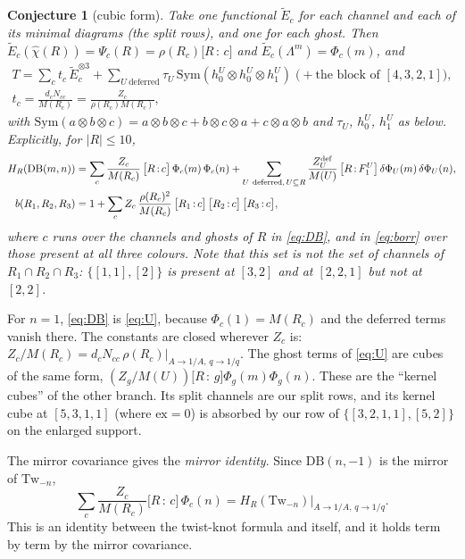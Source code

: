 \documentclass[11pt]{article}
\newtheorem{conjecture}{Conjecture}
\newcommand{\Tw}{\mathrm{Tw}}
\newcommand{\Lam}{\Lambda}
\newcommand{\Et}{\widetilde{E}}
\newcommand{\chih}{\hat\chi}
\newcommand{\cf}[2]{\bigl[#1\,{:}\,#2\bigr]}
\begin{document}
\begin{conjecture}[cubic form]\label{conj:cubic}
Take one functional $\Et_c$ for each channel and each of its minimal diagrams (the split rows), and one for each ghost.
Then $\Et_c(\chih(R))=\Psi_c(R)=\rho(R_c)\cf Rc$ and $\Et_c(\Lam^m)=\Phi_c(m)$, and
\begin{gather*}
T=\sum_ct_c\,\Et_c^{\otimes3}+\sum_{U\ \mathrm{deferred}}\tau_U\,\mathrm{Sym}(h_0^U\otimes h_0^U\otimes h_1^U)
\;\bigl(+\text{the block of }[4,3,2,1]\bigr),\\
t_c=\frac{d_cN_{cc}}{M(R_c)}=\frac{Z_c}{\rho(R_c)M(R_c)},
\end{gather*}
with $\mathrm{Sym}(a\otimes b\otimes c)=a\otimes b\otimes c+b\otimes c\otimes a+c\otimes a\otimes b$ and $\tau_U$, $h_0^U$,
$h_1^U$ as below.  Explicitly, for $|R|\le10$,
\begin{align}
H_R(\mathrm{DB}(m,n))&=\sum_c\frac{Z_c}{M(R_c)}\,\cf Rc\,\Phi_c(m)\,\Phi_c(n)
+\sum_{U\ \mathrm{deferred},\,U\subseteq R}\frac{Z^{\rm def}_U}{M(U)}\,\cf R{F_1^U}\,\delta\Phi_U(m)\,\delta\Phi_U(n),
\label{eq:DB}\\
b(R_1,R_2,R_3)&=1+\sum_cZ_c\,\frac{\rho(R_c)^2}{M(R_c)}\,\cf{R_1}c\,\cf{R_2}c\,\cf{R_3}c, \label{eq:borr}
\end{align}
where $c$ runs over the channels and ghosts of $R$ in \eqref{eq:DB}, and in \eqref{eq:borr} over those present at all
three colours.  Note that this set is not the set of channels of $R_1\cap R_2\cap R_3$: $\{[1,1],[2]\}$ is present at $[3,2]$
and at $[2,2,1]$ but not at $[2,2]$.
\end{conjecture}

For $n=1$, \eqref{eq:DB} is \eqref{eq:U}, because $\Phi_c(1)=M(R_c)$ and the deferred terms vanish there.  The constants are
closed wherever $Z_c$ is: $Z_c/M(R_c)=d_cN_{cc}\,\rho(R_c)|_{A\to1/A,\,q\to1/q}$.  The ghost terms of \eqref{eq:U} are
cubes of the same form, $(Z_g/M(U))\cf Rg\Phi_g(m)\Phi_g(n)$.  These are the ``kernel cubes'' of the other branch.  Its
split channels are our split rows, and its kernel cube at $[5,3,1,1]$ (where $\mathrm{ex}=0$) is absorbed by our row of
$\{[3,2,1,1],[5,2]\}$ on the enlarged support.

The mirror covariance gives the \emph{mirror identity}.  Since $\mathrm{DB}(n,-1)$ is the mirror of $\Tw_{-n}$,
\[
\sum_c\frac{Z_c}{M(R_c)}\cf Rc\,\Phi_c(n)=H_R(\Tw_{-n})\big|_{A\to1/A,\,q\to1/q}.
\]
This is an identity between the twist-knot formula and itself, and it holds term by term by the mirror covariance.
\end{document}
